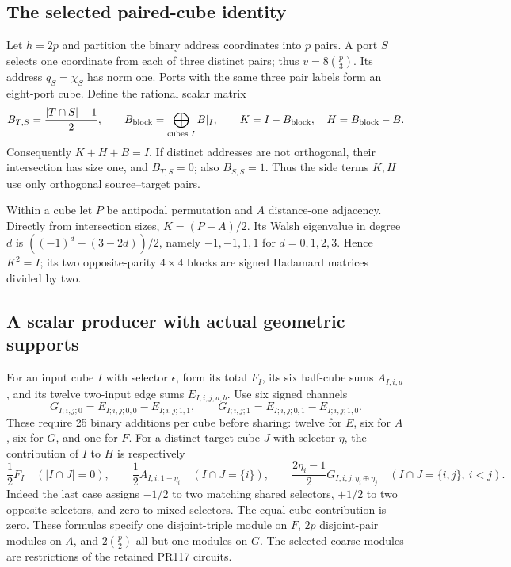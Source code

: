 \subsection{The selected paired-cube identity}
Let $h=2p$ and partition the binary address coordinates into $p$ pairs.
A port $S$ selects one coordinate from each of three distinct pairs;
thus $v=8\binom p3$. Its address $q_S=\chi_S$ has norm one.
Ports with the same three pair labels form an eight-port cube.
Define the rational scalar matrix
\[
 B_{T,S}=\frac{|T\cap S|-1}{2},\qquad
 B_{\rm block}=\bigoplus_{\text{cubes }I}B|_I,\qquad
 K=I-B_{\rm block},\quad H=B_{\rm block}-B.
\]
Consequently $K+H+B=I$. If distinct addresses are not orthogonal,
their intersection has size one, and $B_{T,S}=0$; also $B_{S,S}=1$.
Thus the side terms $K,H$ use only orthogonal source--target pairs.

Within a cube let $P$ be antipodal permutation and $A$ distance-one
adjacency. Directly from intersection sizes, $K=(P-A)/2$.
Its Walsh eigenvalue in degree $d$ is
$((-1)^d-(3-2d))/2$, namely $-1,-1,1,1$ for $d=0,1,2,3$.
Hence $K^2=I$; its two opposite-parity $4\times4$ blocks are signed
Hadamard matrices divided by two.

\subsection{A scalar producer with actual geometric supports}
For an input cube $I$ with selector $\epsilon$, form its total $F_I$,
its six half-cube sums $A_{I;i,a}$, and its twelve two-input edge sums
$E_{I;i,j;a,b}$. Use six signed channels
\[
 G_{I;i,j;0}=E_{I;i,j;0,0}-E_{I;i,j;1,1},\qquad
 G_{I;i,j;1}=E_{I;i,j;0,1}-E_{I;i,j;1,0}.
\]
These require 25 binary additions per cube before sharing: twelve for
$E$, six for $A$, six for $G$, and one for $F$.
For a distinct target cube $J$ with selector $\eta$, the contribution of
$I$ to $H$ is respectively
\[
 \frac12F_I\quad(|I\cap J|=0),\qquad
 \frac12A_{I;i,1-\eta_i}\quad(I\cap J=\{i\}),\qquad
 \frac{2\eta_i-1}{2}G_{I;i,j;\eta_i\oplus\eta_j}
 \quad(I\cap J=\{i,j\},\ i<j).
\]
Indeed the last case assigns $-1/2$ to two matching shared selectors,
$+1/2$ to two opposite selectors, and zero to mixed selectors.
The equal-cube contribution is zero. These formulas specify one
disjoint-triple module on $F$, $2p$ disjoint-pair modules on $A$, and
$2\binom p2$ all-but-one modules on $G$. The selected coarse modules
are restrictions of the retained PR117 circuits.

